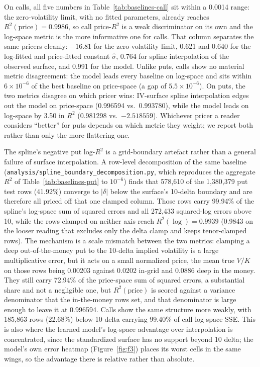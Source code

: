 \documentclass[11pt]{article}
\begin{document}
On calls, all five numbers in Table~\ref{tab:baselines-call} sit within a 0.0014 range: the
zero-volatility limit, with no fitted parameters, already reaches $R^2(\text{price}) = 0.9986$, so
call price-$R^2$ is a weak discriminator on its own and the log-space metric is the more informative
one for calls. That column separates the same pricers cleanly: $-16.81$ for the zero-volatility limit,
0.621 and 0.640 for the log-fitted and price-fitted constant $\hat\sigma$, 0.764 for spline
interpolation of the observed surface, and 0.991 for the model. Unlike puts, calls show no material
metric disagreement: the model leads every baseline on log-space and sits within $6\times10^{-6}$ of
the best baseline on price-space (a gap of $5.5\times10^{-6}$). On puts, the two metrics disagree on
which pricer wins: IV-surface spline interpolation edges out the model on price-space (0.996594 vs.\
0.993780), while the model leads on log-space by 3.50 in $R^2$ (0.981298 vs.\ $-2.518559$).
Whichever pricer a reader considers ``better'' for puts depends on which metric they weight; we
report both rather than only the more flattering one.

The spline's negative put log-$R^2$ is a grid-boundary artefact rather than a general failure of
surface interpolation. A row-level decomposition of the same baseline
(\texttt{analysis/spline\_boundary\_decomposition.py}, which reproduces the aggregate $R^2$ of
Table~\ref{tab:baselines-put} to $10^{-6}$) finds that 578{,}610 of the 1{,}380{,}379 put test rows
(41.92\%) converge to $|\delta|$ below the surface's 10-delta boundary and are therefore all priced off
that one clamped column. Those rows carry 99.94\% of the spline's log-space sum of squared errors and
all 272{,}433 squared-log errors above 10, while the rows clamped on neither axis reach
$R^2(\log) = 0.9939$ (0.9843 on the looser reading that excludes only the delta clamp and keeps
tenor-clamped rows). The mechanism is a scale mismatch between the two metrics: clamping a deep
out-of-the-money put to the 10-delta implied volatility is a large multiplicative error, but it acts on
a small normalized price, the mean true $V/K$ on those rows being 0.00203 against 0.0202 in-grid and
0.0886 deep in the money. They still carry 72.94\% of the price-space sum of squared errors, a
substantial share and not a negligible one, but $R^2(\text{price})$ is scored against a variance
denominator that the in-the-money rows set, and that denominator is large enough to leave it at
0.996594. Calls show the same structure more weakly, with 185{,}863 rows (22.68\%) below 10 delta
carrying 99.40\% of call log-space SSE. This is also where the learned model's log-space advantage over
interpolation is concentrated, since the standardized surface has no support beyond 10 delta; the
model's own error heatmap (Figure~\ref{fig:f3}) places its worst cells in the same wings, so the
advantage there is relative rather than absolute.
\end{document}
